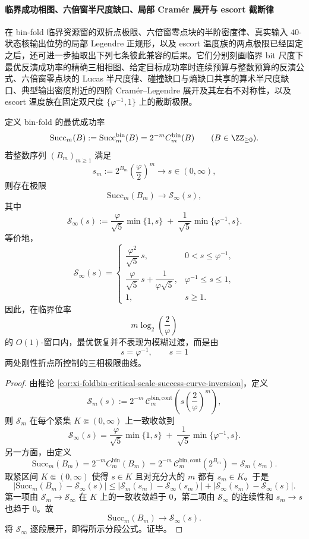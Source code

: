 \paragraph{临界成功相图、六倍窗半尺度缺口、局部 Cram\'er 展开与 escort 截断律}
在 bin-fold 临界资源窗的双折点极限、六倍窗零点块的半阶密度律、真实输入 \(40\)-状态核输出位势的局部 Legendre 正规形，以及 escort 温度族的两点极限已经固定之后，还可进一步抽取出下列七条彼此兼容的后果。它们分别刻画临界 bit 尺度下最优反演成功率的精确三相相图、给定目标成功率时连续预算与整数预算的反演公式、六倍窗零点块的 Lucas 半尺度律、碰撞缺口与熵缺口共享的算术半尺度缺口、典型输出密度附近的四阶 Cram\'er--Legendre 展开及其左右不对称性，以及 escort 温度族在固定双尺度 \(\{\varphi^{-1},1\}\) 上的截断极限。

\begin{theorem}\label{thm:xi-time-part9zk-critical-bit-success-phase-diagram}
定义 bin-fold 的最优成功率
\[
\mathrm{Succ}_m(B):=\mathrm{Succ}_m^{\mathrm{bin}}(B)
=
2^{-m}C_m^{\mathrm{bin}}(B)
\qquad (B\in \ZZ_{\ge 0}).
\]
若整数序列 \((B_m)_{m\ge 1}\) 满足
\[
s_m:=2^{B_m}\left(\frac{\varphi}{2}\right)^m\longrightarrow s\in(0,\infty),
\]
则存在极限
\[
\mathrm{Succ}_m(B_m)\longrightarrow \mathcal S_\infty(s),
\]
其中
\[
\mathcal S_\infty(s)
:=
\frac{\varphi}{\sqrt5}\min\{1,s\}
\;+\;
\frac{1}{\sqrt5}\min\{\varphi^{-1},s\}.
\]
等价地，
\[
\mathcal S_\infty(s)=
\begin{cases}
\dfrac{\varphi^2}{\sqrt5}\,s,
& 0<s\le \varphi^{-1},\\[8pt]
\dfrac{\varphi}{\sqrt5}\,s+\dfrac{1}{\varphi\sqrt5},
& \varphi^{-1}\le s\le 1,\\[10pt]
1,
& s\ge 1.
\end{cases}
\]
因此，在临界位率
\[
m\log_2\!\left(\frac{2}{\varphi}\right)
\]
的 \(O(1)\)-窗口内，最优恢复并不表现为模糊过渡，而是由
\[
s=\varphi^{-1},
\qquad
s=1
\]
两处刚性折点所控制的三相极限曲线。
\end{theorem}
\begin{proof}
由推论 \ref{cor:xi-foldbin-critical-scale-success-curve-inversion}，定义
\[
\mathcal S_m(s):=
2^{-m}\,\mathcal C_m^{\mathrm{bin,cont}}\!\left(
s\left(\frac{2}{\varphi}\right)^m
\right),
\]
则 \(\mathcal S_m\) 在每个紧集 \(K\Subset(0,\infty)\) 上一致收敛到
\[
\mathcal S_\infty(s)
=
\frac{\varphi}{\sqrt5}\min\{1,s\}
\;+\;
\frac{1}{\sqrt5}\min\{\varphi^{-1},s\}.
\]
另一方面，由定义
\[
\mathrm{Succ}_m(B_m)
=
2^{-m}C_m^{\mathrm{bin}}(B_m)
=
2^{-m}\,\mathcal C_m^{\mathrm{bin,cont}}(2^{B_m})
=
\mathcal S_m(s_m).
\]
取紧区间 \(K\Subset(0,\infty)\) 使得 \(s\in K\) 且对充分大的 \(m\) 都有 \(s_m\in K\)。于是
\[
\bigl|\mathrm{Succ}_m(B_m)-\mathcal S_\infty(s)\bigr|
\le
\bigl|\mathcal S_m(s_m)-\mathcal S_\infty(s_m)\bigr|
+
\bigl|\mathcal S_\infty(s_m)-\mathcal S_\infty(s)\bigr|.
\]
第一项由 \(\mathcal S_m\to \mathcal S_\infty\) 在 \(K\) 上的一致收敛趋于 \(0\)，第二项由 \(\mathcal S_\infty\) 的连续性和 \(s_m\to s\) 也趋于 \(0\)。故
\[
\mathrm{Succ}_m(B_m)\to \mathcal S_\infty(s).
\]
将 \(\mathcal S_\infty\) 逐段展开，即得所示分段公式。证毕。
\end{proof}

